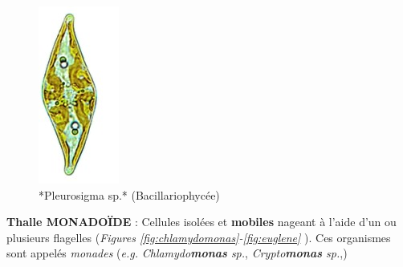 \documentclass[
]{book}
\begin{document}
\begin{figure}[H]

{\centering \includegraphics[width=0.7\linewidth]{./images/pleurosigma} 

}

\caption{*Pleurosigma sp.* (Bacillariophycée)}\label{fig:pleurosigma}
\end{figure}

\textbf{Thalle MONADOÏDE} : Cellules isolées et \textbf{mobiles} nageant à l'aide d'un ou plusieurs flagelles (\emph{Figures \ref{fig:chlamydomonas}-\ref{fig:euglene} }). Ces organismes sont appelés \emph{monades} (\emph{e.g.} \emph{Chlamydo\textbf{monas} sp.}, \emph{Crypto\textbf{monas} sp.},)
\end{document}
